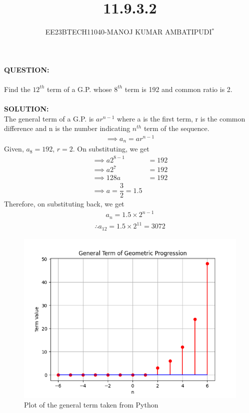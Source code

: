 \documentclass[journal,12pt,twocolumn]{IEEEtran}
\theoremstyle{remark}
\begin{document}

\vspace{3cm}
\title{\textbf{11.9.3.2}}
\author{EE23BTECH11040-MANOJ KUMAR AMBATIPUDI$^{*}$%
}
\maketitle
\newpage
\bigskip
\renewcommand{\thefigure}{\theenumi}
\renewcommand{\thetable}{\theenumi}
\textbf{QUESTION:}\\\\
Find the $12^{th}$ term of a G.P. whose $8^{th}$ term is 192 and common ratio is 2.\\\\
\textbf{SOLUTION:}\\
The general term of a G.P. is $ar^{n-1}$ where a is the first term, r is the common difference and n is the number indicating $n^{th}$ term of the sequence.
\begin{align}
    \implies a_n=ar^{n-1}
\end{align}
Given, $a_8=192$, $r=2$. On substituting, we get
\begin{align}
\implies a2^{8-1}&=192\\
\implies a2^{7}&=192\\
\implies 128a&=192\\
\implies\boxed{a=\dfrac{3}{2}=1.5}
\end{align}
Therefore, on substituting back, we get
\begin{align}
    a_n=1.5\times2^{n-1}
\end{align}
\begin{align}
\therefore a_{12} = 1.5\times2^{11} = 3072
\end{align}
\begin{figure}[h]
    \centering
    \includegraphics[width=1.0\linewidth]{Figure_1.png}
    \caption{Plot of the general term taken from Python}
    \label{fig:1}
\end{figure}\\
\end{document}
